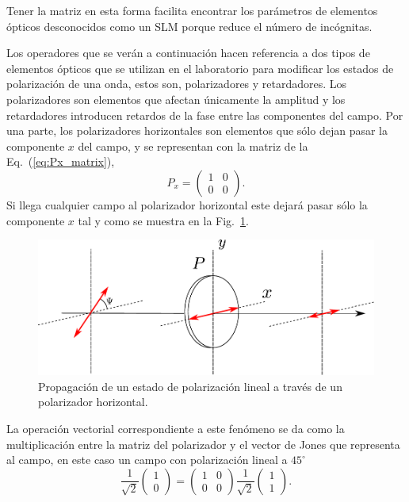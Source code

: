 \begin{enumerate}
Tener la matriz en esta forma facilita encontrar los parámetros de elementos
ópticos desconocidos como un SLM porque reduce el número de incógnitas.

\end{enumerate}

Los operadores que se verán a
continuación hacen referencia a dos tipos de elementos ópticos que se
utilizan en el laboratorio para modificar los estados de polarización
de una onda, estos son, polarizadores y retardadores. Los polarizadores
son elementos que afectan únicamente la amplitud y los
retardadores introducen retardos de la fase entre las componentes del campo.
Por una parte, los polarizadores horizontales son elementos que sólo
dejan pasar la componente $x$ del campo, y se representan con la
matriz de la Eq.~(\ref{eq:Px_matrix}),
\begin{equation}
P_x = \begin{pmatrix}1 &0\\0&0\end{pmatrix}.
\label{eq:Px_matrix}
\end{equation}
Si llega cualquier campo al polarizador horizontal este dejará pasar
sólo la componente $x$ tal y
como se muestra en la Fig.~\ref{fig:linear_polarizer}. 
\begin{figure}[h!]
\centering
\includegraphics[scale = .7]{linear_polarizer}
\caption{Propagación de un estado de polarización lineal a través de
  un polarizador horizontal.}
\label{fig:linear_polarizer}
\end{figure}
La  operación vectorial correspondiente a este fenómeno se da como la
multiplicación entre la matriz del polarizador y el vector de Jones
que representa al campo, en este caso un campo con polarización lineal
a $45^{\circ}$
\begin{equation*}
\frac{1}{\sqrt{2}}
\begin{pmatrix}
1\\0
\end{pmatrix}
=
\begin{pmatrix}
1 &0\\0&0
\end{pmatrix}
\frac{1}{\sqrt{2}}
\begin{pmatrix}
1 \\1
\end{pmatrix}.
\end{equation*}
